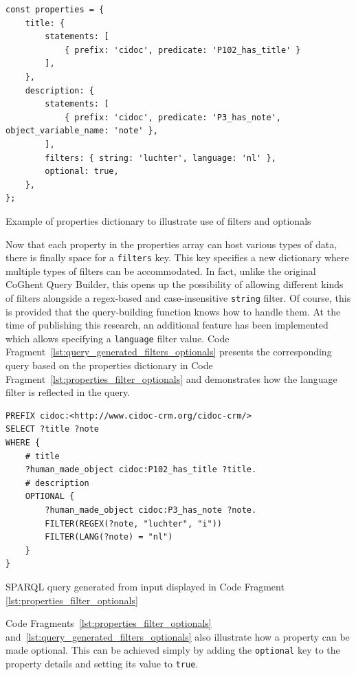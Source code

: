 \begin{listing}[htbp]
    \begin{verbatim}
const properties = {
    title: {
        statements: [
            { prefix: 'cidoc', predicate: 'P102_has_title' }
        ],
    },
    description: {
        statements: [
            { prefix: 'cidoc', predicate: 'P3_has_note', object_variable_name: 'note' },
        ],
        filters: { string: 'luchter', language: 'nl' },
        optional: true,
    },
};
    \end{verbatim}
    \caption{Example of properties dictionary to illustrate use of filters and optionals}
    \label{lst:properties_filter_optionals}
\end{listing}

Now that each property in the properties array can host various types of data, there is finally space for a \texttt{filters} key. This key specifies a new dictionary where multiple types of filters can be accommodated. In fact, unlike the original CoGhent Query Builder, this opens up the possibility of allowing different kinds of filters alongside a regex-based and case-insensitive \texttt{string} filter. Of course, this is provided that the query-building function knows how to handle them. At the time of publishing this research, an additional feature has been implemented which allows specifying a \texttt{language} filter value. Code Fragment~\ref{lst:query_generated_filters_optionals} presents the corresponding query based on the properties dictionary in Code Fragment~\ref{lst:properties_filter_optionals} and demonstrates how the language filter is reflected in the query.

\begin{listing}[htbp]
    \begin{verbatim}
PREFIX cidoc:<http://www.cidoc-crm.org/cidoc-crm/>
SELECT ?title ?note
WHERE {
    # title
    ?human_made_object cidoc:P102_has_title ?title.
    # description
    OPTIONAL {
        ?human_made_object cidoc:P3_has_note ?note.
        FILTER(REGEX(?note, "luchter", "i"))
        FILTER(LANG(?note) = "nl")
    }
}
    \end{verbatim}
    \caption{SPARQL query generated from input displayed in Code Fragment \ref{lst:properties_filter_optionals}}
    \label{lst:query_generated_filters_optionals}
\end{listing}

Code Fragments~\ref{lst:properties_filter_optionals} and~\ref{lst:query_generated_filters_optionals} also illustrate how a property can be made optional. This can be achieved simply by adding the \texttt{optional} key to the property details and setting its value to \texttt{true}.

